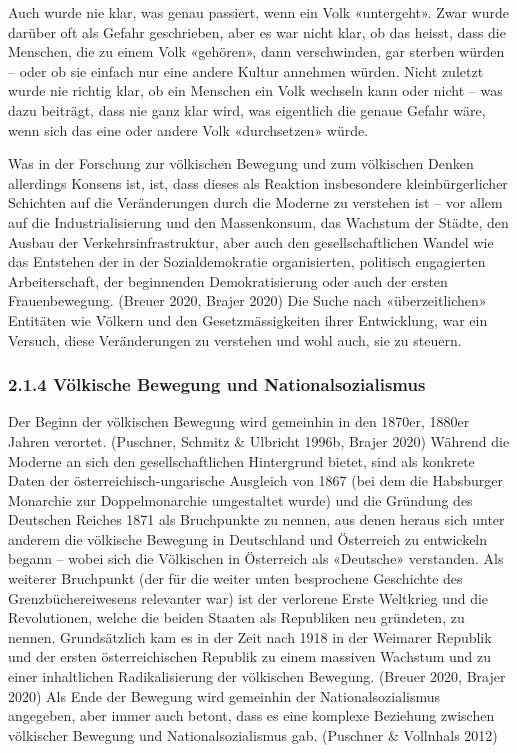 \documentclass[a4paper,
fontsize=11pt,
oneside,
numbers=noperiodatend,
parskip=half-,
bibliography=totoc,
final
]{scrartcl}
\begin{document}
Auch wurde nie klar, was genau passiert, wenn ein Volk «untergeht». Zwar
wurde darüber oft als Gefahr geschrieben, aber es war nicht klar, ob das
heisst, dass die Menschen, die zu einem Volk «gehören», dann
verschwinden, gar sterben würden -- oder ob sie einfach nur eine andere
Kultur annehmen würden. Nicht zuletzt wurde nie richtig klar, ob ein
Menschen ein Volk wechseln kann oder nicht -- was dazu beiträgt, dass
nie ganz klar wird, was eigentlich die genaue Gefahr wäre, wenn sich das
eine oder andere Volk «durchsetzen» würde.

Was in der Forschung zur völkischen Bewegung und zum völkischen Denken
allerdings Konsens ist, ist, dass dieses als Reaktion insbesondere
kleinbürgerlicher Schichten auf die Veränderungen durch die Moderne zu
verstehen ist -- vor allem auf die Industrialisierung und den
Massenkonsum, das Wachstum der Städte, den Ausbau der
Verkehrsinfrastruktur, aber auch den gesellschaftlichen Wandel wie das
Entstehen der in der Sozialdemokratie organisierten, politisch
engagierten Arbeiterschaft, der beginnenden Demokratisierung oder auch
der ersten Frauenbewegung. (Breuer 2020, Brajer 2020) Die Suche nach
«überzeitlichen» Entitäten wie Völkern und den Gesetzmässigkeiten ihrer
Entwicklung, war ein Versuch, diese Veränderungen zu verstehen und wohl
auch, sie zu steuern.

\hypertarget{vuxf6lkische-bewegung-und-nationalsozialismus}{%
\subsubsection{2.1.4 Völkische Bewegung und
Nationalsozialismus}\label{vuxf6lkische-bewegung-und-nationalsozialismus}}

Der Beginn der völkischen Bewegung wird gemeinhin in den 1870er, 1880er
Jahren verortet. (Puschner, Schmitz \& Ulbricht 1996b, Brajer 2020)
Während die Moderne an sich den gesellschaftlichen Hintergrund bietet,
sind als konkrete Daten der österreichisch-ungarische Ausgleich von 1867
(bei dem die Habsburger Monarchie zur Doppelmonarchie umgestaltet wurde)
und die Gründung des Deutschen Reiches 1871 als Bruchpunkte zu nennen,
aus denen heraus sich unter anderem die völkische Bewegung in
Deutschland und Österreich zu entwickeln begann -- wobei sich die
Völkischen in Österreich als «Deutsche» verstanden. Als weiterer
Bruchpunkt (der für die weiter unten besprochene Geschichte des
Grenzbüchereiwesens relevanter war) ist der verlorene Erste Weltkrieg
und die Revolutionen, welche die beiden Staaten als Republiken neu
gründeten, zu nennen. Grundsätzlich kam es in der Zeit nach 1918 in der
Weimarer Republik und der ersten österreichischen Republik zu einem
massiven Wachstum und zu einer inhaltlichen Radikalisierung der
völkischen Bewegung. (Breuer 2020, Brajer 2020) Als Ende der Bewegung
wird gemeinhin der Nationalsozialismus angegeben, aber immer auch
betont, dass es eine komplexe Beziehung zwischen völkischer Bewegung und
Nationalsozialismus gab. (Puschner \& Vollnhals 2012)
\end{document}

